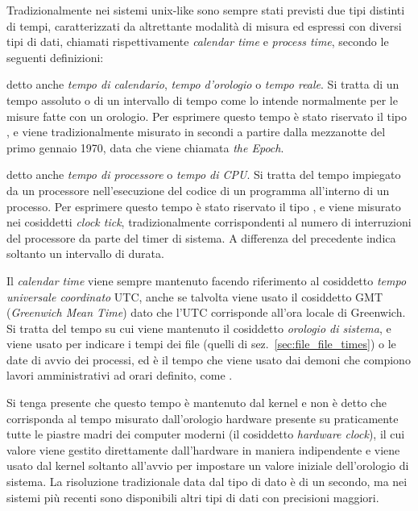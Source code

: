 Tradizionalmente nei sistemi unix-like sono sempre stati previsti due tipi
distinti di tempi, caratterizzati da altrettante modalità di misura ed
espressi con diversi tipi di dati, chiamati rispettivamente \textit{calendar
  time} e \textit{process time}, secondo le seguenti definizioni:
\begin{basedescript}{\desclabelwidth{1.5cm}\desclabelstyle{\nextlinelabel}}

\item[\textit{calendar time}] detto anche \textsl{tempo di calendario}, 
  \textsl{tempo d'orologio} o \textit{tempo reale}. Si tratta di un
  tempo assoluto o di un intervallo di tempo come lo intende
  normalmente per le misure fatte con un orologio. Per esprimere
  questo tempo è stato riservato il tipo , e viene
  tradizionalmente misurato in secondi a partire dalla mezzanotte del
  primo gennaio 1970, data che viene chiamata \textit{the Epoch}.

\item[\textit{process time}] detto anche \textsl{tempo di processore} o
  \textsl{tempo di CPU}. Si tratta del tempo impiegato da un processore
  nell'esecuzione del codice di un programma all'interno di un processo. Per
  esprimere questo tempo è stato riservato il tipo , e viene
  misurato nei cosiddetti \textit{clock tick}, tradizionalmente corrispondenti
  al numero di interruzioni del processore da parte del timer di sistema. A
  differenza del precedente indica soltanto un intervallo di durata.
\end{basedescript}

Il \textit{calendar time} viene sempre mantenuto facendo riferimento
al cosiddetto \textit{tempo universale coordinato} UTC, anche se
talvolta viene usato il cosiddetto GMT (\textit{Greenwich Mean Time})
dato che l'UTC corrisponde all'ora locale di Greenwich. Si tratta del
tempo su cui viene mantenuto il cosiddetto \textsl{orologio di
  sistema}, e viene usato per indicare i tempi dei file (quelli di
sez.~\ref{sec:file_file_times}) o le date di avvio dei processi, ed è
il tempo che viene usato dai demoni che compiono lavori amministrativi
ad orari definito, come .

Si tenga presente che questo tempo è mantenuto dal kernel e non è detto che
corrisponda al tempo misurato dall'orologio hardware presente su praticamente
tutte le piastre madri dei computer moderni (il cosiddetto \textit{hardware
  clock}), il cui valore viene gestito direttamente dall'hardware in maniera
indipendente e viene usato dal kernel soltanto all'avvio per impostare un
valore iniziale dell'orologio di sistema. La risoluzione tradizionale data dal
tipo di dato  è di un secondo, ma nei sistemi più recenti sono
disponibili altri tipi di dati con precisioni maggiori.

